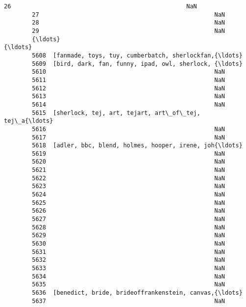 \documentclass[11pt]{article}
\begin{document}
\begin{Verbatim}[commandchars=\\\{\}]
        26                                                  NaN   
        27                                                  NaN   
        28                                                  NaN   
        29                                                  NaN   
        {\ldots}                                                 {\ldots}   
        5608  [fanmade, toys, tuy, cumberbatch, sherlockfan,{\ldots}   
        5609  [bird, dark, fan, funny, ipad, owl, sherlock, {\ldots}   
        5610                                                NaN   
        5611                                                NaN   
        5612                                                NaN   
        5613                                                NaN   
        5614                                                NaN   
        5615  [sherlock, tej, art, tejart, art\_of\_tej, tej\_a{\ldots}   
        5616                                                NaN   
        5617                                                NaN   
        5618  [adler, bbc, blend, holmes, hooper, irene, joh{\ldots}   
        5619                                                NaN   
        5620                                                NaN   
        5621                                                NaN   
        5622                                                NaN   
        5623                                                NaN   
        5624                                                NaN   
        5625                                                NaN   
        5626                                                NaN   
        5627                                                NaN   
        5628                                                NaN   
        5629                                                NaN   
        5630                                                NaN   
        5631                                                NaN   
        5632                                                NaN   
        5633                                                NaN   
        5634                                                NaN   
        5635                                                NaN   
        5636  [benedict, bride, brideoffrankenstein, canvas,{\ldots}   
        5637                                                NaN   
        

\end{Verbatim}
\end{document}
